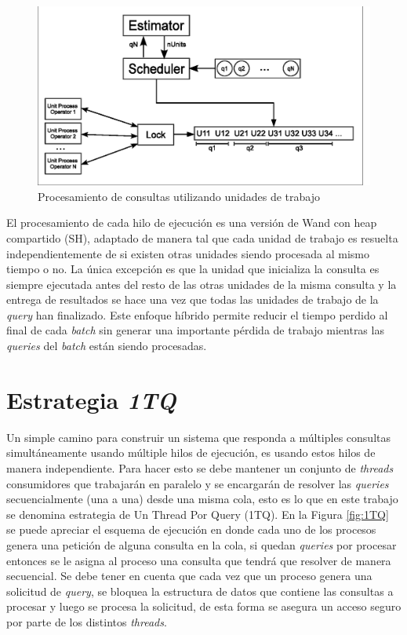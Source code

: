 \begin{figure}[!th]
\centering
\includegraphics[scale=.75]{images/unit_process.eps}
\caption{Procesamiento de consultas utilizando unidades de trabajo}
\label{fig:unit_process}
\end{figure}

El procesamiento de cada hilo de ejecución es una versión de Wand con heap compartido (SH), adaptado de manera tal que cada unidad de trabajo es resuelta independientemente de si existen otras unidades siendo procesada al mismo tiempo o no. La única excepción es que la unidad que inicializa la consulta es siempre ejecutada antes del resto de las otras unidades de la misma consulta y la entrega de resultados se hace una vez que todas las unidades de trabajo de la \textit{query} han finalizado. Este enfoque híbrido permite reducir el tiempo perdido al final de cada \textit{batch} sin generar una importante pérdida de trabajo mientras las \textit{queries} del \textit{batch} están siendo procesadas.



\section{Estrategia \textit{1TQ}}
\label{scheduling:baseline}
Un simple camino para construir un sistema que responda a múltiples consultas simultáneamente usando múltiple hilos de ejecución, es usando estos hilos de manera independiente. Para hacer esto se debe mantener un conjunto de \textit{threads} consumidores que trabajarán en paralelo y se encargarán de resolver las \textit{queries} secuencialmente (una a una) desde una misma cola, esto es lo que en este trabajo se denomina estrategia de Un Thread Por Query (1TQ). En la Figura \ref{fig:1TQ} se puede apreciar el esquema de ejecución en donde cada uno de los procesos genera una petición de alguna consulta en la cola, si quedan \textit{queries} por procesar entonces se le asigna al proceso una consulta que tendrá que resolver de manera secuencial. Se debe tener en cuenta que cada vez que un proceso genera una solicitud de \textit{query}, se bloquea la estructura de datos que contiene las consultas a procesar y luego se procesa la solicitud, de esta forma se asegura un acceso seguro por parte de los distintos \textit{threads}. 

